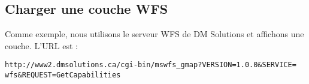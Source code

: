 \subsection{Charger une couche WFS}

Comme exemple, nous utilisons le serveur WFS de DM Solutions et affichons une
couche. L'URL est :
\begin{verbatim}
http://www2.dmsolutions.ca/cgi-bin/mswfs_gmap?VERSION=1.0.0&SERVICE=
wfs&REQUEST=GetCapabilities
\end{verbatim}

